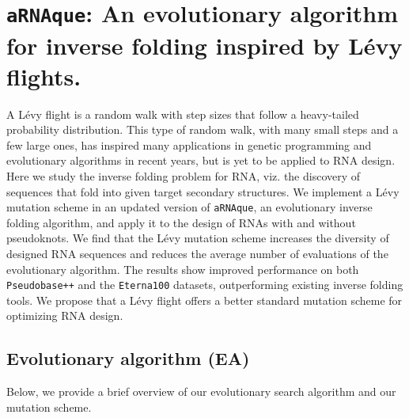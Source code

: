 \chapter{\texttt{aRNAque}: An evolutionary algorithm for inverse folding inspired by Lévy flights.}\label{ch:arnaque}

	A Lévy flight is a random walk with step sizes that follow a heavy-tailed probability distribution. This type of random walk, with many small steps and a few large ones, has inspired many applications in genetic programming and evolutionary algorithms in recent years, but is yet to be applied to RNA design. Here we study the inverse folding problem for RNA, viz. the discovery of sequences that fold into given target secondary structures. We implement a Lévy mutation scheme in an updated version of \texttt{aRNAque}, an evolutionary inverse folding algorithm, and apply it to the design of RNAs with and without pseudoknots. We find that the Lévy mutation scheme increases the diversity of designed RNA sequences and reduces the average number of evaluations of the evolutionary algorithm. The results show improved performance on both \texttt{Pseudobase++} and the \texttt{Eterna100} datasets, outperforming existing inverse folding tools. We propose that a Lévy flight offers a better standard mutation scheme for optimizing RNA design.

\section*{Evolutionary algorithm (EA)}
Below, we provide a brief overview of our evolutionary search algorithm and our mutation scheme. 
